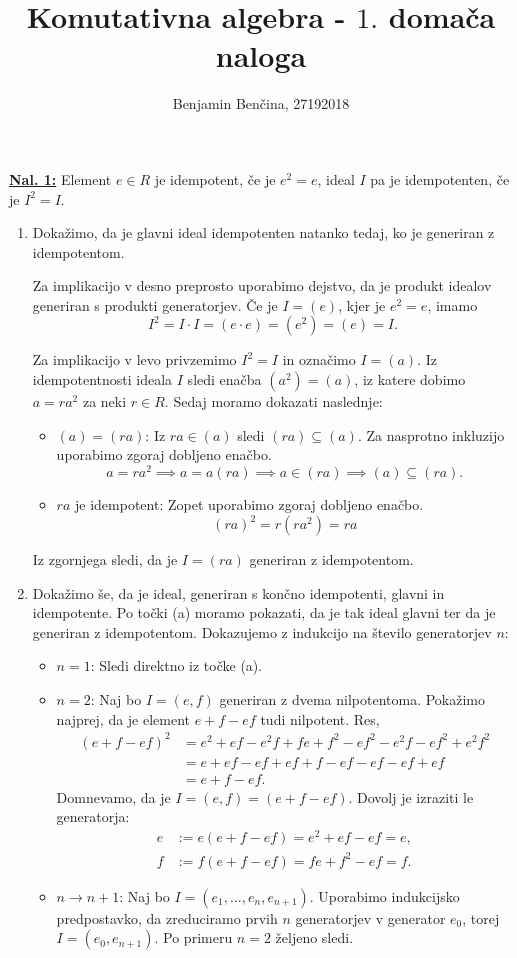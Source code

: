 \documentclass[a4paper, 12pt]{article} %
\title{Komutativna algebra - $1.$ domača naloga}
\author{Benjamin Benčina, 27192018}
\begin{document}
\maketitle

\underline{\textbf{Nal. 1:}}
Element $e \in R$ je idempotent, če je $e^2 = e$, ideal $I$ pa je idempotenten, če je $I^2=I$.

\begin{enumerate}[label=(\alph*)]
	\item Dokažimo, da je glavni ideal idempotenten natanko tedaj, ko je generiran z idempotentom.
	
	Za implikacijo v desno preprosto uporabimo dejstvo, da je produkt idealov generiran s produkti generatorjev. Če je $I = (e)$, kjer je $e^2 = e$, imamo \[I^2 = I\cdot I = (e\cdot e) = (e^2) = (e) = I.\]
	
	Za implikacijo v levo privzemimo $I^2 = I$ in označimo $I = (a)$. Iz idempotentnosti ideala $I$ sledi enačba $(a^2) = (a)$, iz katere dobimo $a = ra^2$ za neki $r \in R$. Sedaj moramo dokazati naslednje:
	\begin{itemize}
		\item $(a) = (ra)$: Iz $ra \in (a)$ sledi $(ra) \subseteq (a)$. Za nasprotno inkluzijo uporabimo zgoraj dobljeno enačbo.
		\[
		a = ra^2 \implies a = a(ra) \implies a \in (ra) \implies (a) \subseteq (ra).
		\]
		\item $ra$ je idempotent: Zopet uporabimo zgoraj dobljeno enačbo.
		\[
		(ra)^2 = r(ra^2) = ra
		\]
	\end{itemize}
	Iz zgornjega sledi, da je $I = (ra)$ generiran z idempotentom.
	\item Dokažimo še, da je ideal, generiran s končno idempotenti, glavni in idempotente. Po točki (a) moramo pokazati, da je tak ideal glavni ter da je generiran z idempotentom. Dokazujemo z indukcijo na število generatorjev $n$:
	\begin{itemize}
		\item $n = 1$: Sledi direktno iz točke (a).
		\item $n = 2$: Naj bo $I = (e, f)$ generiran z dvema nilpotentoma.
		Pokažimo najprej, da je element $e + f - ef$ tudi nilpotent. Res,
		\begin{align*}
		(e+f-ef)^2 
		&= e^2 + ef - e^2f + fe + f^2 - ef^2 - e^2f - ef^2 + e^2f^2 \\
		&= e + ef - ef + ef + f - ef - ef - ef + ef \\ 
		&= e + f - ef.
		\end{align*}
		Domnevamo, da je $I = (e, f) = (e + f - ef)$. Dovolj je izraziti le generatorja:
		\begin{align*}
		e &:= e(e + f - ef) = e^2 + ef - ef = e, \\
		f &:= f(e + f - ef) = fe + f^2 - ef = f.
		\end{align*}
		\item $n \to n+1$: Naj bo $I = (e_1,\dots, e_n, e_{n+1})$. Uporabimo indukcijsko predpostavko, da zreduciramo prvih $n$ generatorjev v generator $e_0$, torej $I = (e_0, e_{n+1})$. Po primeru $n = 2$ željeno sledi.
	\end{itemize}
\end{enumerate}
\end{document}
